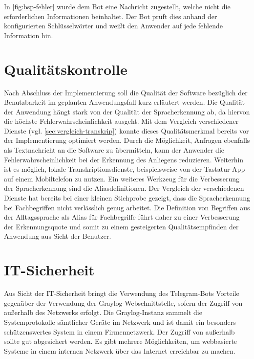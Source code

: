 In \autoref{fig:bsp-fehler} wurde dem Bot eine Nachricht zugestellt, welche nicht die erforderlichen Informationen beinhaltet. Der Bot prüft dies anhand der konfigurierten Schlüsselwörter und weißt den Anwender auf jede fehlende Information hin. 

\section{Qualitätskontrolle}

Nach Abschluss der Implementierung soll die Qualität der Software bezüglich der Benutzbarkeit im geplanten Anwendungsfall kurz erläutert werden. Die Qualität der Anwendung hängt stark von der Qualität der Spracherkennung ab, da hiervon die höchste Fehlerwahrscheinlichkeit ausgeht. Mit dem Vergleich verschiedener Dienste (vgl. \autoref{sec:vergleich-transkrip}) konnte dieses Qualitätsmerkmal bereits vor der Implementierung optimiert werden. Durch die Möglichkeit, Anfragen ebenfalls als Textnachricht an die Software zu übermitteln, kann der Anwender die Fehlerwahrscheinlichkeit bei der Erkennung des Anliegens reduzieren. Weiterhin ist es möglich, lokale Transkriptionsdienste, beispielsweise von der Tastatur-App auf einem Mobiltelefon zu nutzen. Ein weiteres Werkzeug für die Verbesserung der Spracherkennung sind die Aliasdefinitionen. Der Vergleich der verschiedenen Dienste hat bereits bei einer kleinen Stichprobe gezeigt, dass die Spracherkennung bei Fachbegriffen nicht verlässlich genug arbeitet. Die Definition von Begriffen aus der Alltagssprache als Alias für Fachbegriffe führt daher zu einer Verbesserung der Erkennungsquote und somit zu einem gesteigerten Qualitätsempfinden der Anwendung aus Sicht der Benutzer.

\section{IT-Sicherheit}

Aus Sicht der IT-Sicherheit bringt die Verwendung des Telegram-Bots Vorteile gegenüber der Verwendung der Graylog-Webschnittstelle, sofern der Zugriff von außerhalb des Netzwerks erfolgt. Die Graylog-Instanz sammelt die Systemprotokolle sämtlicher Geräte im Netzwerk und ist damit ein besonders schützenswertes System in einem Firmennetzwerk. Der Zugriff von außerhalb sollte gut abgesichert werden. Es gibt mehrere Möglichkeiten, um webbasierte Systeme in einem internen Netzwerk über das Internet erreichbar zu machen. 


